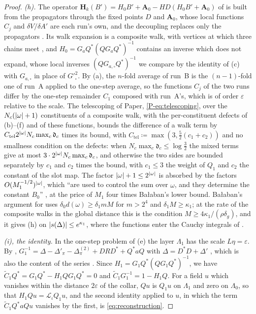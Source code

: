 \documentclass[11pt]{preprint}
\DeclarePairedDelimiter{\abs}{\lvert}{\rvert}
\numberwithin{equation}{section}
\theoremstyle{definition}
\theoremstyle{remark}
\theoremstyle{plain}
\begin{document}
\begin{proof}
\emph{(h).} The operator $\mathbf H_k(B') = H_0B' + \mathbf A_0 - HD(H_0B' + \mathbf A_0)$ of \cite[(1.2)--(1.4), p.~2]{BalabanRG2} is built from the propagators through the fixed points $D$ and $\mathbf A_0$, whose local functions $C_j$ \cite[(44), (49)]{BalabanVAR} and $\delta V/\delta A'$ \cite[(80)]{BalabanVAR} are each run's own, and the decoupling replaces only the propagators \cite[p.~3]{BalabanRG2}. Its walk expansion is a composite walk, with vertices at which three chains meet \cite[p.~427]{BalabanPBG}, and $H_0 = G_aQ^*(QG_aQ^*)^{-1}$ \cite[(129), p.~297]{BalabanVAR} contains an inverse which \cite{BalabanPBG} does not expand, whose local inverses $(QG_{a,\square}Q^*)^{-1}$ we compare by the identity of (c) with $G_{a,\square}$ in place of $G'^2_\square$. By (a), the $n$-fold average of run~B is the $(n - 1)$-fold one of run~A applied to the one-step average, so the functions $C_j$ of the two runs differ by the one-step remainder $C_1$ composed with run~A's, which is of order $\varepsilon$ relative to the scale. The telescoping of Paper, \eqref{P-eq:telescoping}, over the $N_c(\abs\omega + 1)$ constituents of a composite walk, with the per-constituent defects of (b)--(f) and of these functions, bounds the difference of a walk term by $C_{\mathrm{tel}}2^{\abs\omega}N_c\max_c\mathfrak d_c$ times its bound, with $C_{\mathrm{tel}} \coloneqq \max(3, \frac52(c_1 + c_2))$ and no smallness condition on the defects: when $N_c\max_c\mathfrak d_c \leq \log\frac32$ the mixed terms give at most $3 \cdot 2^{\abs\omega}N_c\max_c\mathfrak d_c$, and otherwise the two sides are bounded separately by $c_1$ and $c_2$ times the bound, with $c_1 \leq 3$ the weight of $Q_1$ and $c_2$ the constant of the slot map. The factor $\abs\omega + 1 \leq 2^{\abs\omega}$ is absorbed by the factors $O(M_1^{-1/2})^{\abs\omega}$, which ``are used to control the sum over $\omega$, and they determine the constant $B_0$'' \cite[p.~3]{BalabanRG2}, at the price of $M_1$ four times Ba{\l}aban's lower bound. Ba{\l}aban's argument for \cite[(1.11), p.~5]{BalabanRG2} uses $\delta_0d(\omega) \geq \delta_1mM$ for $m > 2^4$ and $\delta_1M \geq \kappa_1$; at the rate of the composite walks in the global distance this is the condition $M \geq 4\kappa_1/(\rho\delta_g)$, and it gives (h) on $\abs{s(\Delta)} \leq e^{\kappa_1}$, where the functions enter the Cauchy integrals of \cite[(1.23), p.~7]{BalabanRG2}.

\emph{(i), the identity.} In the one-step problem of (e) the layer $\Lambda_1$ has the scale $L\eta = \varepsilon$. By \cite[(3.120), (3.128), (3.134), (3.135)]{BalabanPBG}, $G_1^{-1} = \Delta - \Delta'_\pi - \Delta^{(2)}_\pi + DRD^* + Q^*aQ$ with $\Delta = D^*D + \Delta'$ \cite[(3.10)]{BalabanPBG}, which is also the content of the series \cite[(3.138)]{BalabanPBG}. Since $H_1 = G_1Q^*(QG_1Q^*)^{-1}$, we have $\tilde C_1Q^* = G_1Q^* - H_1QG_1Q^* = 0$ and $\tilde C_1G_1^{-1} = 1 - H_1Q$. For a field $u$ which vanishes within the distance $2\varepsilon$ of the collar, $Qu$ is $Q_1u$ on $\Lambda_1$ and zero on $\Lambda_0$, so that $H_1Qu = \mathcal L_\iota Q_1u$, and the second identity applied to $u$, in which the term $\tilde C_1Q^*aQu$ vanishes by the first, is \eqref{eq:reconstruction}.


\end{proof}
\end{document}

